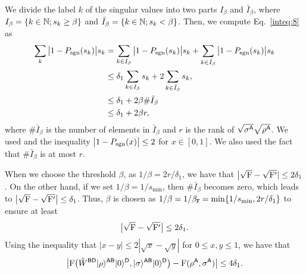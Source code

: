 We divide the label $k$ of the singular values into two parts $I_\beta$ and $\bar{I}_\beta$, where $I_\beta = \{k \in \mathbb{N}; s_k \geq \beta\}$ and $\bar{I}_\beta = \{k \in \mathbb{N}; s_k < \beta\}$.
Then, we compute Eq.~\eqref{inteq:8} as
\begin{align}
    \sum_k \big|1 - P_{\mathrm{sgn}}(s_k)\big|s_k
    &= \sum_{k\in I_\beta} \big|1 - P_{\mathrm{sgn}}(s_k)\big|s_k 
    + \sum_{k\in \bar{I}_\beta} \big|1 - P_{\mathrm{sgn}}(s_k)\big|s_k \\
    &\leq \delta_1 \sum_{k\in I_\beta} s_k + 2\sum_{k\in \bar{I}_\beta}s_k, \\
    &\leq \delta_1 + 2\beta \#\bar{I}_\beta \\
    &\leq \delta_1 + 2\beta r,
\end{align}
where $\#\bar{I}_\beta$ is the number of elements in $\bar{I}_\beta$ and $r$ is the rank of $\sqrt{\sigma^{\mathsf{A}}}\sqrt{\rho^{\mathsf{A}}}$.
We used  and the inequality $\big|1 - P_{\mathrm{sgn}}(x)\big| \leq 2$ for $x \in [0, 1]$.
We also used the fact that $\#\bar{I}_\beta$ is at most $r$.


When we choose the threshold $\beta$, as $1/\beta = 2r/\delta_1$, we have that
$\big|\sqrt{{\mathrm{F}}} - \sqrt{{\mathrm{F}}'}| \leq 2\delta_1$.
On the other hand, if we set $1/\beta = 1/s_{\min}$, then $\#\bar{I}_\beta$ becomes zero, which leads to $\big|\sqrt{{\mathrm{F}}} - \sqrt{{\mathrm{F}}'}\big| \leq \delta_1$.
Thus, $\beta$ is chosen as $1/\beta =  1/\beta_{\mathtt{F}} = \min\{1/s_{\rm min}, 2r/\delta_1\}$ to ensure at least 
\begin{align}
\label{inteq:13}
    \big|\sqrt{{\mathrm{F}}} - \sqrt{{\mathrm{F}}'}\big| \leq 2\delta_1.
\end{align}
Using the inequality that $|x-y|\leq 2 |\sqrt{x} - \sqrt{y}|$ for $0 \leq x, y \leq 1$, we have that
\begin{align}
    \big|{\mathrm{F}}\big(\tilde{W}^{{\mathsf{B}}{\mathsf{D}}}|\rho\rangle^{{\mathsf{A}}{\mathsf{B}}}|0\rangle^{{\mathsf{D}}}, |\sigma\rangle^{{\mathsf{A}}{\mathsf{B}}}|0\rangle^{{\mathsf{D}}}\big)
    - {\mathrm{F}}(\rho^{\mathsf{A}}, \sigma^{\mathsf{A}})\big|\leq 4 \delta_1.
\end{align}


